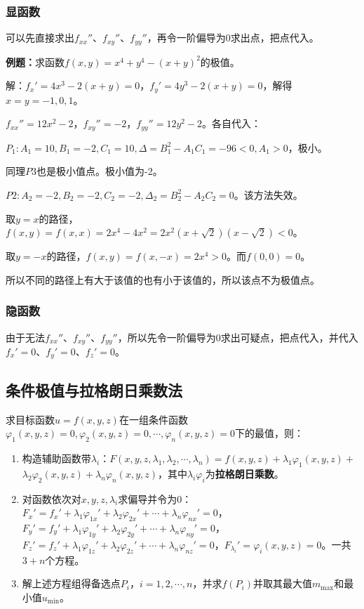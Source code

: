 \documentclass[UTF8, 12pt]{ctexart}
\begin{document}
\subsubsection{显函数}

可以先直接求出$f_{xx}''$、$f_{xy}''$、$f_{yy}''$，再令一阶偏导为0求出点，把点代入。

\textbf{例题：}求函数$f(x,y)=x^4+y^4-(x+y)^2$的极值。

解：$f_x'=4x^3-2(x+y)=0$，$f_y'=4y^3-2(x+y)=0$，解得$x=y=-1,0,1$。

$f_{xx}''=12x^2-2$，$f_{xy}''=-2$，$f_{yy}''=12y^2-2$。各自代入：

$P_1:A_1=10,B_1=-2,C_1=10,\Delta=B_1^2-A_1C_1=-96<0,A_1>0$，极小。

同理$P3$也是极小值点。极小值为-2。

$P2:A_2=-2,B_2=-2,C_2=-2,\Delta_2=B_2^2-A_2C_2=0$。该方法失效。

取$y=x$的路径，$f(x,y)=f(x,x)=2x^4-4x^2=2x^2(x+\sqrt{2})(x-\sqrt{2})<0$。

取$y=-x$的路径，$f(x,y)=f(x,-x)=2x^4>0$。而$f(0,0)=0$。

所以不同的路径上有大于该值的也有小于该值的，所以该点不为极值点。

\subsubsection{隐函数}

由于无法$f_{xx}''$、$f_{xy}''$、$f_{yy}''$，所以先令一阶偏导为0求出可疑点，把点代入，并代入$f_x'=0$、$f_y'=0$、$f_z'=0$。

\subsection{条件极值与拉格朗日乘数法}

求目标函数$u=f(x,y,z)$在一组条件函数$\varphi_1(x,y,z)=0,\varphi_2(x,y,z)=0,\cdots,\varphi_n(x,y,z)=0$下的最值，则：

\begin{enumerate}
    \item 构造辅助函数带$\lambda_i$：$F(x,y,z,\lambda_1,\lambda_2,\cdots,\lambda_n)=f(x,y,z)+\lambda_1\varphi_1(x,y,z)+$\\$\lambda_2\varphi_2(x,y,z)+\lambda_n\varphi_n(x,y,z)$，其中$\lambda_i\varphi_i$为\textbf{拉格朗日乘数}。
    \item 对函数依次对$x,y,z,\lambda_i$求偏导并令为0：$F_x'=f_x'+\lambda_1\varphi_{1x}'+\lambda_2\varphi_{2x}'+\cdots+\lambda_n\varphi_{nx}'=0$，$F_y'=f_y'+\lambda_1\varphi_{1y}'+\lambda_2\varphi_{2y}'+\cdots+\lambda_n\varphi_{ny}'=0$，$F_z'=f_z'+\lambda_1\varphi_{1z}'+\lambda_2\varphi_{2z}'+\cdots+\lambda_n\varphi_{nz}'=0$，$F_{\lambda_i}'=\varphi_i(x,y,z)=0$。一共$3+n$个方程。
    \item 解上述方程组得备选点$P_i$，$i=1,2,\cdots,n$，并求$f(P_i)$并取其最大值$m_{\max}$和最小值$u_{\min}$。
\end{enumerate}
\end{document}
